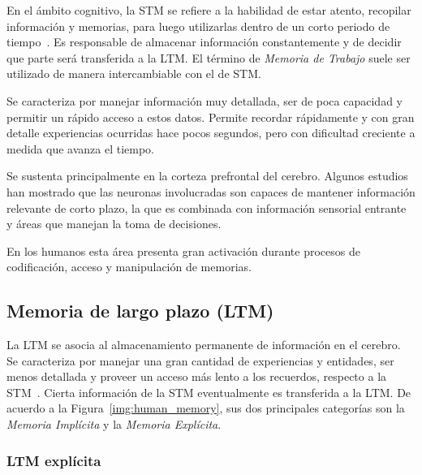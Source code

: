 En el ámbito cognitivo, la STM se refiere a la habilidad de estar atento, recopilar información  y memorias, para luego utilizarlas dentro de un corto periodo de tiempo~\cite{Eichenbaum:2008}. Es responsable de almacenar información constantemente y de decidir que parte será transferida a la LTM. El término de \textit{Memoria de Trabajo} suele ser utilizado de manera intercambiable con el de STM.

Se caracteriza por manejar información muy detallada, ser de poca capacidad y permitir un rápido acceso a estos datos. Permite recordar rápidamente y con gran detalle experiencias ocurridas hace pocos segundos, pero con dificultad creciente a medida que avanza el tiempo.

Se sustenta principalmente en la corteza prefrontal del cerebro. Algunos estudios han mostrado que las neuronas involucradas son capaces de mantener información relevante de corto plazo, la que es combinada con información sensorial entrante y áreas que manejan la toma de decisiones. 

En los humanos esta área presenta gran activación durante procesos de codificación, acceso y manipulación de memorias.


\subsection{Memoria de largo plazo (LTM)}


La LTM se asocia al almacenamiento permanente de información en el cerebro. Se caracteriza por manejar una gran cantidad de experiencias y entidades, ser menos detallada y proveer un acceso más lento a los recuerdos, respecto a la STM~\cite{Eichenbaum:2008}. Cierta información de la STM eventualmente es transferida a la LTM. De acuerdo a la Figura~\ref{img:human_memory}, sus dos principales categorías son la \textit{Memoria Implícita} y la \textit{Memoria Explícita}.


\subsubsection{LTM explícita}


